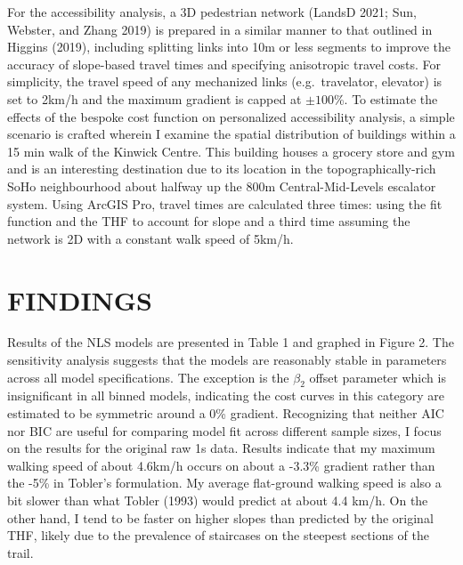\documentclass{article}
\begin{document}
For the accessibility analysis, a 3D pedestrian network (LandsD 2021;
Sun, Webster, and Zhang 2019) is prepared in a similar manner to that
outlined in Higgins (2019), including splitting links into 10m or less
segments to improve the accuracy of slope-based travel times and
specifying anisotropic travel costs. For simplicity, the travel speed of
any mechanized links (e.g.~travelator, elevator) is set to 2km/h and the
maximum gradient is capped at \(\pm{100}\)\%. To estimate the effects of
the bespoke cost function on personalized accessibility analysis, a
simple scenario is crafted wherein I examine the spatial distribution of
buildings within a 15 min walk of the Kinwick Centre. This building
houses a grocery store and gym and is an interesting destination due to
its location in the topographically-rich SoHo neighbourhood about
halfway up the 800m Central-Mid-Levels escalator system. Using ArcGIS
Pro, travel times are calculated three times: using the fit function and
the THF to account for slope and a third time assuming the network is 2D
with a constant walk speed of 5km/h.

\hypertarget{findings}{%
\section{FINDINGS}\label{findings}}

Results of the NLS models are presented in Table 1 and graphed in Figure
2. The sensitivity analysis suggests that the models are reasonably
stable in parameters across all model specifications. The exception is
the \(\beta_2\) offset parameter which is insignificant in all binned
models, indicating the cost curves in this category are estimated to be
symmetric around a 0\% gradient. Recognizing that neither AIC nor BIC
are useful for comparing model fit across different sample sizes, I
focus on the results for the original raw 1s data. Results indicate that
my maximum walking speed of about 4.6km/h occurs on about a -3.3\%
gradient rather than the -5\% in Tobler's formulation. My average
flat-ground walking speed is also a bit slower than what Tobler (1993)
would predict at about 4.4 km/h. On the other hand, I tend to be faster
on higher slopes than predicted by the original THF, likely due to the
prevalence of staircases on the steepest sections of the trail.

 
  \providecommand{\huxb}[2]{\arrayrulecolor[RGB]{#1}\global\arrayrulewidth=#2pt}
  \providecommand{\huxvb}[2]{\color[RGB]{#1}\vrule width #2pt}
  \providecommand{\huxtpad}[1]{\rule{0pt}{#1}}
  \providecommand{\huxbpad}[1]{\rule[-#1]{0pt}{#1}}
\end{document}
